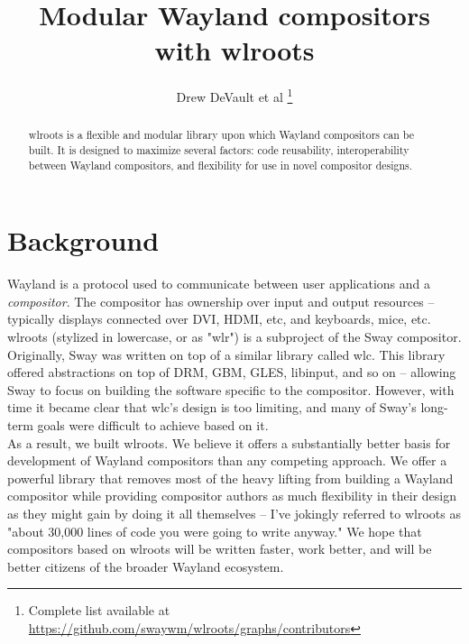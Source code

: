 \documentclass{article}
\begin{document}
\title{Modular Wayland compositors with wlroots}
\author{Drew DeVault et al
    \thanks{Complete list available at \url{https://github.com/swaywm/wlroots/graphs/contributors}}}
\maketitle

\begin{abstract}
wlroots is a flexible and modular library upon which Wayland compositors can be
built. It is designed to maximize several factors: code reusability,
interoperability between Wayland compositors, and flexibility for use in novel
compositor designs.
\end{abstract}

\newpage
\tableofcontents

\newpage
\section{Background}\label{background}

Wayland is a protocol used to communicate between user applications and a
\emph{compositor}. The compositor has ownership over input and output
resources -- typically displays connected over DVI, HDMI, etc, and keyboards,
mice, etc.\\

wlroots (stylized in lowercase, or as "wlr") is a subproject of the Sway
compositor. Originally, Sway was written on top of a similar library called wlc.
This library offered abstractions on top of DRM, GBM, GLES, libinput, and so on
-- allowing Sway to focus on building the software specific to the compositor.
However, with time it became clear that wlc's design is too limiting, and many
of Sway's long-term goals were difficult to achieve based on it.\\

As a result, we built wlroots. We believe it offers a substantially better
basis for development of Wayland compositors than any competing approach.
We offer a powerful library that removes most of the heavy lifting from building
a Wayland compositor while providing compositor authors as much flexibility in
their design as they might gain by doing it all themselves -- I've jokingly
referred to wlroots as
"about 30,000 lines of code you were going to write anyway." We hope that
compositors based on wlroots will be written faster, work better, and will
be better citizens of the broader Wayland ecosystem.
\end{document}

